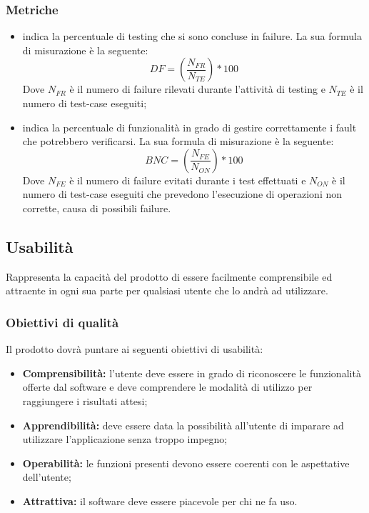 \documentclass[PianoDiQualifica.tex]{subfiles}
\begin{document}
\subsubsection{Metriche}
\begin{itemize}
	\item {} indica la percentuale di testing che si sono concluse in failure. La sua formula di misurazione è la seguente: \[DF=(\frac{N_{FR}}{N_{TE}})*100\] Dove $ N_{FR} $ è il numero di failure rilevati durante l'attività di testing e $ N_{TE} $ è il numero di test-case eseguiti;
	\item {} indica la percentuale di funzionalità in grado di gestire correttamente i fault che potrebbero verificarsi. La sua formula di misurazione è la seguente: \[BNC=(\frac{N_{FE}}{N_{ON}})*100\] Dove $ N_{FE} $ è il numero di failure evitati durante i test effettuati e $ N_{ON} $ è il numero di test-case eseguiti che prevedono l'esecuzione di operazioni non corrette, causa di possibili failure.
\end{itemize}
\subsection{Usabilità}
Rappresenta la capacità del prodotto di essere facilmente comprensibile ed attraente in ogni sua parte per qualsiasi utente che lo andrà ad utilizzare.
\subsubsection{Obiettivi di qualità}
Il prodotto dovrà puntare ai seguenti obiettivi di usabilità:
\begin{itemize}
	\item \textbf{Comprensibilità:} l'utente deve essere in grado di riconoscere le funzionalità offerte dal software e deve comprendere le modalità di utilizzo per raggiungere i risultati attesi;
	\item \textbf{Apprendibilità:} deve essere data la possibilità all'utente di imparare ad utilizzare l'applicazione senza troppo impegno;
	\item \textbf{Operabilità:} le funzioni presenti devono essere coerenti con le aspettative dell'utente;
	\item \textbf{Attrattiva:} il software deve essere piacevole per chi ne fa uso.
\end{itemize}
\end{document}
